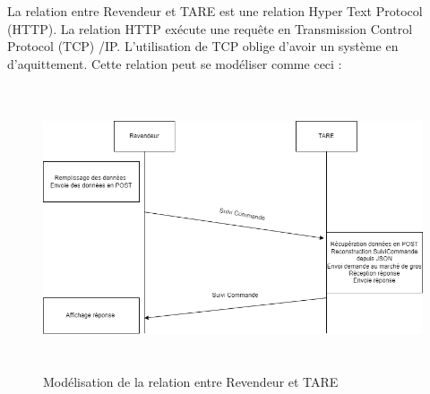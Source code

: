 La relation entre Revendeur et TARE est une relation Hyper Text Protocol (HTTP). La relation HTTP exécute une requête en Transmission Control Protocol (TCP) /IP. L'utilisation de TCP oblige d'avoir un système en d'aquittement. Cette relation peut se modéliser comme ceci :
\\[2cm]
\begin{figure}[h]
    \centering
    \includegraphics[width=150mm, height=84mm]{images/RevendeurTARE.png}
    \caption{Modélisation de la relation entre Revendeur et TARE}
    \label{img:mesh17}
\end{figure}
\newpage